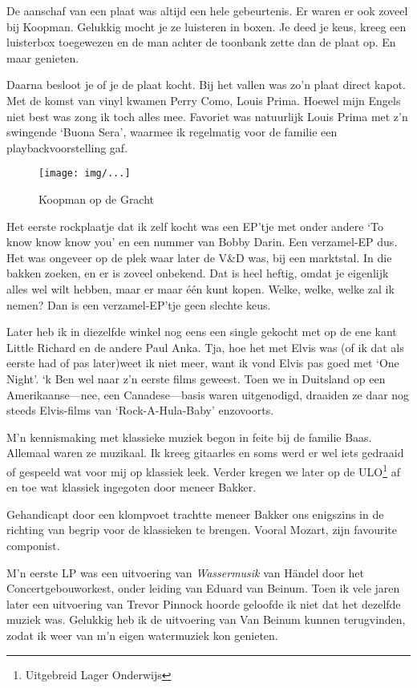 \documentclass[10pt,twoside,openright]{memoir}
\begin{document}
De aanschaf van een plaat was altijd een hele gebeurtenis. Er waren er ook zoveel bij Koopman. Gelukkig mocht je ze luisteren in boxen. Je deed je keus, kreeg een luisterbox toegewezen en de man achter de toonbank zette dan de plaat op. En maar genieten. 

Daarna besloot je of je de plaat kocht. Bij het vallen was zo’n plaat direct kapot. Met de komst van vinyl kwamen Perry Como, Louis Prima. Hoewel mijn Engels niet best was zong ik toch alles mee. Favoriet was natuurlijk Louis Prima met z’n swingende `Buona Sera', waarmee ik regelmatig voor de familie een playbackvoorstelling gaf.

\begin{figure}[t]
\texttt{[image: img/...]}
\caption{Koopman op de Gracht}
\end{figure}

Het eerste rockplaatje dat ik zelf kocht was een EP'tje met onder andere `To know know know you' en een nummer van Bobby Darin. Een verzamel-EP dus. Het was ongeveer op de plek waar later de V\&D was, bij een marktstal. In die bakken zoeken, en er is zoveel onbekend. Dat is heel heftig, omdat je eigenlijk alles wel wilt hebben, maar er maar één kunt kopen. Welke, welke, welke zal ik nemen? Dan is een verzamel-EP'tje geen slechte keus.

Later heb ik in diezelfde winkel nog eens een single gekocht met op de ene kant Little Richard en de andere Paul Anka. Tja, hoe het met Elvis was (of ik dat als eerste had of pas later)weet ik niet meer, want ik vond Elvis pas goed met `One Night'. `k Ben wel naar z'n eerste films geweest. Toen we in Duitsland op een Amerikaanse---nee, een Canadese---basis waren uitgenodigd, draaiden ze daar nog steeds Elvis-films van `Rock-A-Hula-Baby' enzovoorts.

M’n kennismaking met klassieke muziek begon in feite bij de familie Baas. Allemaal waren ze muzikaal. Ik kreeg gitaarles en soms werd er wel iets gedraaid of gespeeld wat voor mij op klassiek leek. Verder kregen we later op de ULO\footnote{Uitgebreid Lager Onderwijs} af en toe wat klassiek ingegoten door meneer Bakker. 

Gehandicapt door een klompvoet trachtte meneer Bakker ons enigszins in de richting van begrip voor de klassieken te brengen. Vooral Mozart, zijn favourite componist.

M’n eerste LP was een uitvoering van \emph{Wassermusik} van Händel door het Concertgebouworkest, onder leiding van Eduard van Beinum. Toen ik vele jaren later een uitvoering van Trevor Pinnock hoorde geloofde ik niet dat het dezelfde muziek was. Gelukkig heb ik de uitvoering van Van Beinum kunnen terugvinden, zodat ik weer van m’n eigen watermuziek kon genieten. 
\end{document}
